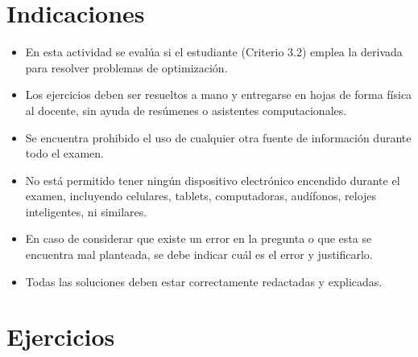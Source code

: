 \documentclass[11pt,respuestas,a4]{aleph-examen}
\begin{document}
\encabezado

\vspace{-5mm}
\section*{Indicaciones}
\begin{itemize}[leftmargin=*]
\item
    En esta actividad se evalúa si el estudiante (Criterio 3.2) emplea la derivada para resolver problemas de optimización.
\item
    Los ejercicios deben ser resueltos a mano y entregarse en hojas de forma física al docente, sin ayuda de resúmenes o asistentes computacionales.
\item
    Se encuentra prohibido el uso de cualquier otra fuente de información durante todo el examen.
\item
    No está permitido tener ningún dispositivo electrónico encendido durante el examen, incluyendo celulares, tablets, computadoras, audífonos, relojes inteligentes, ni similares.
\item
    En caso de considerar que existe un error en la pregunta o que esta se encuentra mal planteada, se debe indicar cuál es el error y justificarlo.
\item
    Todas las soluciones deben estar correctamente redactadas y explicadas.
\end{itemize}

\section*{Ejercicios}
\end{document}
